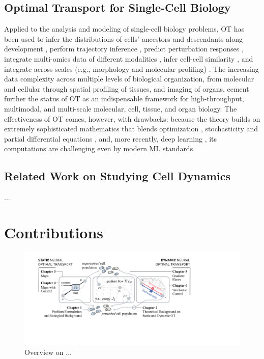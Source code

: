 \subsection{Optimal Transport for Single-Cell Biology}
\label{sec:ot_for_biology}
Applied to the analysis and modeling of single-cell biology problems, OT has been used to infer the distributions of cells' ancestors and descendants along development \citep{schiebinger2019optimal}, perform trajectory inference \citep{bunne2022proximal, forrow2021lineageot, bunne2022recovering, lavenant2021towards, schiebinger2019optimal, tong2020trajectorynet, yang2020predicting, zhang2021optimal, chizat2022trajectory}, predict perturbation responses \citep{bunne2021learning, yang2018scalable, lubeck2022neural}, integrate multi-omics data of different modalities \citep{demetci2022scot}, infer cell-cell similarity \citep{huizing2022optimal}, and integrate across scales (e.g., morphology and molecular profiling) \citep{yang2021multi}. The increasing data complexity across multiple levels of biological organization, from molecular and cellular through spatial profiling \citep{moriel2021novosparc} of tissues, and imaging of organs, cement further the status of OT as an indispensable framework for high-throughput, multimodal, and multi-scale molecular, cell, tissue, and organ biology. The effectiveness of OT comes, however, with drawbacks: because the theory builds on extremely sophisticated mathematics that blends optimization \citep{cuturi2013sinkhorn, cuturi2022optimal}, stochasticity \citep{chizat2022trajectory, bunne2022recovering} and partial differential equations \citep{bunne2022proximal}, and, more recently, deep learning \citep{tong2020trajectorynet, bunne2021learning, bunne2022supervised, yang2018scalable, lubeck2022neural, yang2021multi}, its computations are challenging even by modern ML standards.


\subsection{Related Work on Studying Cell Dynamics}

...

\section{Contributions}

\begin{figure}[t]
  \includegraphics[width=\textwidth]{figures/fig_overview_thesis.pdf}
  \caption{Overview on ...}
  \label{fig:overview_thesis}
\end{figure}


